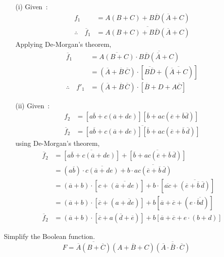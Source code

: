 \begin{solution}
\begin{itemize}
\item[(i)] Given~:
\begin{align*}
f_{1} &= A(B+C)+B\overline{D}(\overline{A}+C)\\[3pt]
\therefore\quad \overline{f}_{1} &= \overline{A(B+C)+B\overline{D}(\overline{A}+C)}
\end{align*}
Applying De-Morgan's theorem,
\begin{align*}
\overline{f}_{1} &= \overline{A(B+C)}\cdot \overline{B\overline{D}(\overline{A}+C)}\\[3pt]
&= (\overline{A}+\overline{B}\,\overline{C})\cdot [\overline{B\overline{D}}+(\overline{\overline{A}+C})]\\[3pt]
\therefore\quad f'_{1} &= (\overline{A}+\overline{B}\,\overline{C})\cdot [\overline{B}+D+A\overline{C}]
\end{align*}

\item[(ii)] Given~:
\begin{align*}
f_{2} &= [a\overline{b}+c(\overline{a}+de)][\overline{b}+ac(\overline{e}+\overline{b}\overline{d})]\\[3pt]
\overline{f}_{2} &= \overline{[a\overline{b}+c(\overline{a}+de)][\overline{b}+ac(\overline{e}+\overline{b}\,\overline{d})]}
\end{align*}
using De-Morgan's theorem,
\begin{align*}
\overline{f}_{2} &= \overline{[a\overline{b}+c(\overline{a}+de)]}+\overline{[\overline{b}+ac(\overline{e}+\overline{b}\,\overline{d})]}\\[3pt]
&= (a\overline{b})\cdot \overline{c(\overline{a}+de)}+b\cdot \overline{ac(\overline{e}+\overline{b}\,\overline{d})}\\[3pt]
&= (\overline{a}+b)\cdot [c+\overline{(\overline{a}+de)}]+b\cdot [\overline{ac}+\overline{(\overline{e}+\overline{b}\,\overline{d})}]\\[3pt]
&= (\overline{a}+b)\cdot [\overline{c}+(a+\overline{d}e)]+b[\overline{a}+\overline{c}+(e\cdot \overline{\overline{b}d})]\\[3pt]
\overline{f}_{2} &= (\overline{a}+b)\cdot [\overline{c}+a(\overline{d}+\overline{e})]+b[\overline{a}+\overline{c}+e\cdot (b+d)]
\end{align*}
\end{itemize}
\end{solution}

\begin{problem}\label{prob5.65}
Simplify the Boolean function.
$$
F=\overline{\overline{A}(B+\overline{C})}(A+\overline{B}+C)\overline{(\overline{A}\cdot \overline{B}\cdot \overline{C})}
$$
\end{problem}


